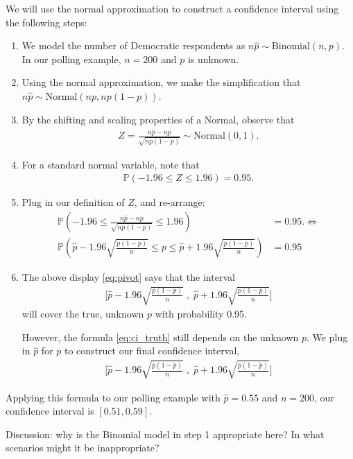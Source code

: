 \documentclass[11pt]{article}
\theoremstyle{definition}
\renewcommand{\P}{\mathbb{P}}
\begin{document}
We will use the normal approximation to
construct a confidence interval using the following steps:
\begin{enumerate}
  \item We model the number of Democratic respondents as
  $n\hat p \sim \text{Binomial}(n, p)$.
  In our polling example, $n = 200$ and $p$ is unknown.
  \item Using the normal approximation, we make the simplification that
  $n\hat p \sim \text{Normal}(np, np(1-p))$.
  \item By the shifting and scaling properties
  of a Normal,
  observe that
  \begin{align*}
    Z = \frac{n\hat p - np}{\sqrt{np(1-p)}} \sim \text{Normal}(0, 1).
  \end{align*}
  \item For a standard normal variable, note that
  \begin{align*}
    \P(-1.96 \leq Z \leq 1.96) = 0.95.
  \end{align*}
  \item Plug in our definition of $Z$, and re-arrange:
  \begin{align}
    \P\left(-1.96 \leq \frac{n\hat p - np}{\sqrt{np(1-p)}} \leq 1.96\right) &= 0.95.
    \iff \\
    \P\left(\hat p -1.96\sqrt{\frac{p(1-p)}{n}} \leq p \leq \hat p + 1.96\sqrt{\frac{p(1-p)}{n}}\right) &= 0.95
    \label{eq:pivot}
  \end{align}
  \item The above display \ref{eq:pivot} says that the interval
  \begin{align}
    \Big[\hat p - 1.96\sqrt{\frac{p(1-p)}{n}} \;,\;
    \hat p + 1.96\sqrt{\frac{p(1-p)}{n}}\Big]
    \label{eq:ci_truth}
  \end{align}
  will cover the true, unknown $p$ with probability 0.95.

  However, the formula \ref{eq:ci_truth} still depends on the unknown $p$.
  We plug in $\hat p$ for $p$ to construct our final confidence interval,
  \begin{align*}
    \Big[\hat p - 1.96\sqrt{\frac{\hat p(1-\hat p)}{n}} \;,\;
    \hat p + 1.96\sqrt{\frac{\hat p(1-\hat p)}{n}}\Big]
  \end{align*}
\end{enumerate}

Applying this formula to our polling example with $\hat p = 0.55$ and $n = 200$, our confidence interval is
$[0.51, 0.59]$.

Discussion: why is the Binomial model in step 1 appropriate here? In what scenarios might it be inappropriate?
\end{document}
